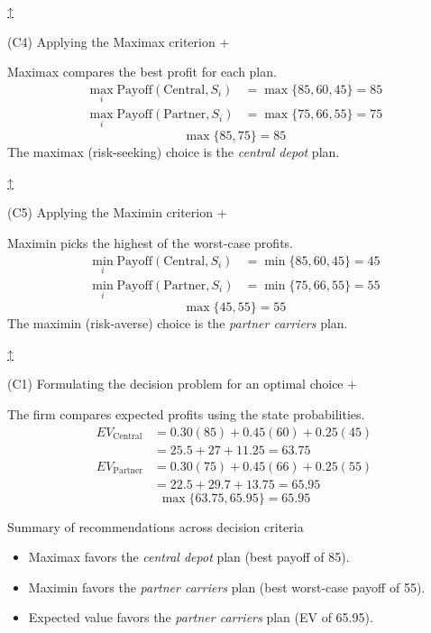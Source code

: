 \documentclass[11pt]{article}
\begin{document}
	
	\hyperref[problem5-criteria]{↑}
	
	
	
	
	(C4) Applying the Maximax criterion
	+
	
	
	Maximax compares the best profit for each plan.
	\[
	\begin{aligned}
		\max_i \text{Payoff}(\text{Central}, S_i) &= \max\{85, 60, 45\} = 85 \\
		\max_i \text{Payoff}(\text{Partner}, S_i) &= \max\{75, 66, 55\} = 75
	\end{aligned}
	\]
	\[
	\max\{85, 75\} = 85
	\]
	The maximax (risk-seeking) choice is the \emph{central depot} plan.
	
	
	\hyperref[problem5-criteria]{↑}
	
	
	
	
	(C5) Applying the Maximin criterion
	+
	
	
	Maximin picks the highest of the worst-case profits.
	\[
	\begin{aligned}
		\min_i \text{Payoff}(\text{Central}, S_i) &= \min\{85, 60, 45\} = 45 \\
		\min_i \text{Payoff}(\text{Partner}, S_i) &= \min\{75, 66, 55\} = 55
	\end{aligned}
	\]
	\[
	\max\{45, 55\} = 55
	\]
	The maximin (risk-averse) choice is the \emph{partner carriers} plan.
	
	
	\hyperref[problem5-criteria]{↑}
	
	
	
	
	(C1) Formulating the decision problem for an optimal choice
	+
	
	
	The firm compares expected profits using the state probabilities.
	\[
	\begin{aligned}
		EV_{\text{Central}} &= 0.30(85) + 0.45(60) + 0.25(45) \\
		&= 25.5 + 27 + 11.25 = 63.75 \\
		EV_{\text{Partner}} &= 0.30(75) + 0.45(66) + 0.25(55) \\
		&= 22.5 + 29.7 + 13.75 = 65.95
	\end{aligned}
	\]
	\[
	\max\{63.75, 65.95\} = 65.95
	\]
	
	Summary of recommendations across decision criteria
	\begin{itemize}
		\item Maximax favors the \emph{central depot} plan (best payoff of 85).
		\item Maximin favors the \emph{partner carriers} plan (best worst-case payoff of 55).
		\item Expected value favors the \emph{partner carriers} plan (EV of 65.95).
	\end{itemize}
	
\end{document}

